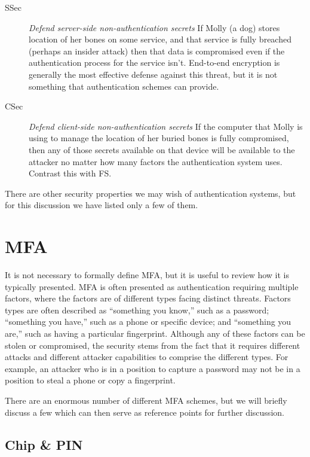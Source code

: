 \documentclass{soups}
\newcommand{\propdescription}[1]{\textit{#1}\newline}
\begin{document}
\begin{description}
  \item[SSec] \propdescription{Defend server-side non-authentication secrets}
    If Molly (a dog) stores location of her bones on some service,
    and that service is fully breached (perhaps an insider attack)
    then that data is compromised even if the authentication process for the service isn't.
    End-to-end encryption is generally the most effective defense against this threat,
    but it is not something that authentication schemes can provide.

  \item[CSec] \propdescription{Defend client-side non-authentication secrets}
    If the computer that Molly is using to manage the location of her buried bones is fully compromised,
    then any of those secrets available on that device will be available to the attacker no matter how many factors the authentication system uses.
    Contrast this with FS.
  
\end{description}

There are other security properties we may wish of authentication systems, but for this discussion we have listed only a few of them.

\section{MFA}

It is not necessary to formally define MFA, but it is useful to review how it is typically presented.
MFA is often presented as authentication requiring multiple factors, where the factors are of different types facing distinct threats.
Factors types are often described as “something you know,” such as a password;
“something you have,” such as a phone or specific device;
and “something you are,” such as having a particular fingerprint.
Although any of these factors can be stolen or compromised,
the security stems from the fact that it requires different attacks and different attacker capabilities to comprise the different types.
For example, an attacker who is in a position to capture a password may not be in a position to steal a phone or copy a fingerprint.

There are an enormous number of different MFA schemes,
but we will briefly discuss a few
which can then serve as reference points for further discussion.

\subsection{Chip \& PIN}
\end{document}
